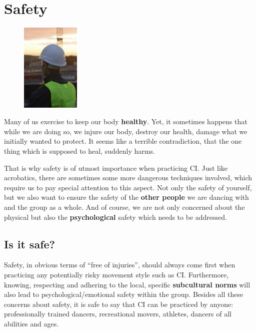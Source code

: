 \chapter{Safety}\label{ch:safety}

\begin{figure}
    \centering
    \includegraphics[width=0.25\textwidth]{images/safety}
\end{figure}

Many of us exercise to keep our body \textbf{healthy}.
Yet, it sometimes happens that while we are doing so, we injure our body, destroy our health, damage what we initially wanted to protect.
It seems like a terrible contradiction, that the one thing which is supposed to heal, suddenly harms.

That is why safety is of utmost importance when practicing CI\@.
Just like acrobatics, there are sometimes some more dangerous techniques involved, which require us to pay special attention to this aspect.
Not only the safety of yourself, but we also want to ensure the safety of the \textbf{other people} we are dancing with and the group as a whole.
And of course, we are not only concerned about the physical but also the \textbf{psychological} safety which needs to be addressed.

\section{Is it safe?}\label{sec:is-it-safe?}

Safety, in obvious terms of ``free of injuries'', should always come first when practicing any potentially risky movement style such as CI\@.
Furthermore, knowing, respecting and adhering to the local, specific \textbf{subcultural norms} will also lead to psychological/emotional safety within the group.
Besides all these concerns about safety, it is safe to say that CI can be practiced by anyone: professionally trained dancers, recreational movers, athletes, dancers of all abilities and ages.

